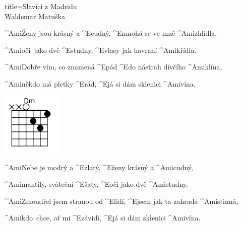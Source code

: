 \begin{song}{title=\predtitle\centering Slavíci z Madridu \\\large Waldemar Matuška \vspace*{-0.3cm}}
\begin{centerjustified}
\phantom{.}

\begin{minipage}{0.65\textwidth}
\sloka
	^{Ami\z}Ženy jsou krásný a ^{E\z}cudný, ^{E\z}mnohá se ve mně ^{Ami\z}zhlídla,

	^{Ami\z}oči~jako dvě ^{E\z}studny, ^{E\z}vlasy jak havraní ^{Ami\z}křídla.

	^{Ami\z}Dobře vím, co znamená ^{E}pád ^{E}do nástrah dívčího ^{Ami\z}klína,

	^{Ami\z}někdo má pletky ^{E\:}rád, ^{E}já si dám sklenici ^{Ami\z}vína.
\end{minipage}
\begin{minipage}{0.1\textwidth}
\includegraphics[width=3cm]{../Akordy/dm}
\end{minipage}

\phantom{.}


\sloka
	^{Ami\z}Nebe je modrý a ^{E\z}zlatý, ^{E\z}ženy krásný a ^{Ami\z}cudný,

	^{Ami\z}mantily, sváteční ^{E\z}šaty, ^{E\z}oči jako dvě ^{Ami\z}studny.

	^{Ami\z}Zmoudřel jsem stranou od ^{E\z}lidí, ^{E\z}jsem jak ta zahrada ^{Ami\z}stinná,

	^{Ami\z}kdo~chce, ať mi ^{E\z}závidí, ^{E}já si dám sklenici ^{Ami\z}vína.\:



\end{centerjustified}
\setcounter{Slokočet}{0}
\end{song}
\begin{figure}[h]
\predtitle\centering
\end{figure}
